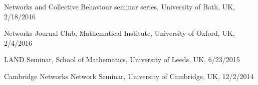 \documentclass[11pt,letter]{article}
\renewenvironment{itemize}{
  \begin{list}{}{
    \setlength{\leftmargin}{1.5em}
    \setlength{\itemsep}{0.25em}
    \setlength{\parskip}{0pt}
    \setlength{\parsep}{0.25em}
  }
}{
  \end{list}
}
\begin{document}
\begin{itemize}



\item
Networks and Collective Behaviour seminar series,
University of Bath, UK, 2/18/2016


\item
Networks Journal Club, Mathematical Institute, University of Oxford, UK, 2/4/2016


\item
LAND Seminar, School of Mathematics, University of Leeds, UK, 6/23/2015


\item
Cambridge Networks Network Seminar, University of Cambridge, UK, 12/2/2014



\end{itemize}
\end{document}
